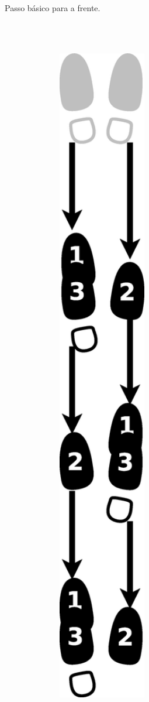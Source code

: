 \begin{itemize}
\begin{figure}[h]
\begin{subfigure}[b]{0.7\textwidth}
        \caption{Passo básico para a frente.}
        \label{fig:samba-batucada-basico-frente}
    \end{subfigure}
    ~\\~\\ %
    \begin{subfigure}[b]{0.7\textwidth}
        \centering
	\includegraphics[angle=270,width=0.97\textwidth]{chapters/cap-historia-sambagafieira/samba-batucada-basico-tras.eps}

\end{subfigure}
\end{figure}
\end{itemize}
